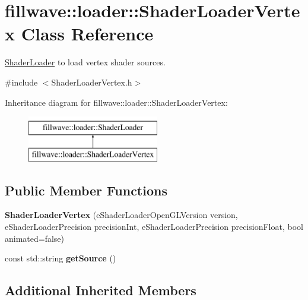 \hypertarget{classfillwave_1_1loader_1_1ShaderLoaderVertex}{}\section{fillwave\+:\+:loader\+:\+:Shader\+Loader\+Vertex Class Reference}
\label{classfillwave_1_1loader_1_1ShaderLoaderVertex}


\hyperlink{classfillwave_1_1loader_1_1ShaderLoader}{Shader\+Loader} to load vertex shader sources.  




{\ttfamily \#include $<$Shader\+Loader\+Vertex.\+h$>$}

Inheritance diagram for fillwave\+:\+:loader\+:\+:Shader\+Loader\+Vertex\+:\begin{figure}[H]
\begin{center}
\leavevmode
\includegraphics[height=2.000000cm]{classfillwave_1_1loader_1_1ShaderLoaderVertex}
\end{center}
\end{figure}
\subsection*{Public Member Functions}
\begin{DoxyCompactItemize}
\item 
\hypertarget{classfillwave_1_1loader_1_1ShaderLoaderVertex_a3b1bd18fa1aa076f11d56b35d77b6d42}{}{\bfseries Shader\+Loader\+Vertex} (e\+Shader\+Loader\+Open\+G\+L\+Version version, e\+Shader\+Loader\+Precision precision\+Int, e\+Shader\+Loader\+Precision precision\+Float, bool animated=false)\label{classfillwave_1_1loader_1_1ShaderLoaderVertex_a3b1bd18fa1aa076f11d56b35d77b6d42}

\item 
\hypertarget{classfillwave_1_1loader_1_1ShaderLoaderVertex_a1876139bf452f755c2ae81fcd0890034}{}const std\+::string {\bfseries get\+Source} ()\label{classfillwave_1_1loader_1_1ShaderLoaderVertex_a1876139bf452f755c2ae81fcd0890034}

\end{DoxyCompactItemize}
\subsection*{Additional Inherited Members}


